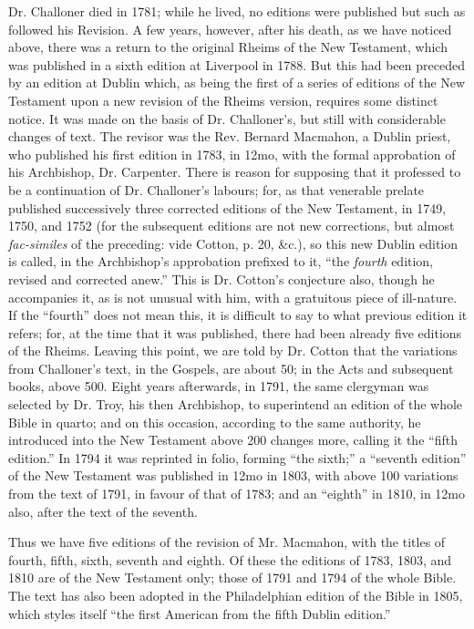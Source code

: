
Dr. Challoner died in 1781; while he lived, no editions were
published but such as followed his Revision. A few years, however,
after his death, as we have noticed above, there was a return to the
original Rheims of the New Testament, which was published in a sixth
edition at Liverpool in 1788. But this had been preceded by an edition
at Dublin which, as being the first of a series of editions of the New
Testament upon a new revision of the Rheims version, requires some
distinct notice. It was made on the basis of Dr. Challoner's, but
still with considerable changes of text. The revisor was the Rev.
Bernard Macmahon, a Dublin priest, who published his first edition in
1783, in 12mo, with the formal approbation of his Archbishop, Dr.
Carpenter. There is reason for supposing that it professed to be a
continuation of Dr. Challoner's labours; for, as that venerable
prelate published successively three corrected editions of the New
Testament, in 1749, 1750, and 1752 (for the subsequent editions
are not new corrections, but almost \emph{fac-similes} of the
preceding: vide Cotton, p. 20, \&c.), so this new Dublin edition is
called, in the Archbishop's approbation prefixed to it, ``the \emph{fourth}
edition, revised and corrected anew.'' This is Dr. Cotton's
conjecture also, though he accompanies it, as is not unusual with him,
with a gratuitous piece of ill-nature. If the ``fourth'' does
not mean this, it is difficult to say to what previous edition it
refers; for, at the time that it was published, there had been already
five editions of the Rheims. Leaving this point, we are told by Dr.
Cotton that the variations from Challoner's text, in the Gospels, are
about 50; in the Acts and subsequent books, above 500. Eight years
afterwards, in 1791, the same clergyman was selected by Dr. Troy, his
then Archbishop, to superintend an edition of the whole Bible in
quarto; and on this occasion, according to the same authority, he
introduced into the New Testament above 200 changes more, calling it
the ``fifth edition.'' In 1794 it was reprinted in folio,
forming ``the sixth;'' a ``seventh edition'' of the
New Testament was published in 12mo in 1803, with above 100 variations
from the text of 1791, in favour of that of 1783; and an
``eighth'' in 1810, in 12mo also, after the text of the
seventh.

Thus we have five editions of the revision of Mr. Macmahon, with
the titles of fourth, fifth, sixth, seventh and eighth. Of these the
editions of 1783, 1803, and 1810 are of the New Testament only; those
of 1791 and 1794 of the whole Bible. The text has also been adopted
in the Philadelphian edition of the Bible in 1805, which styles
itself ``the first American from the fifth Dublin edition.''


